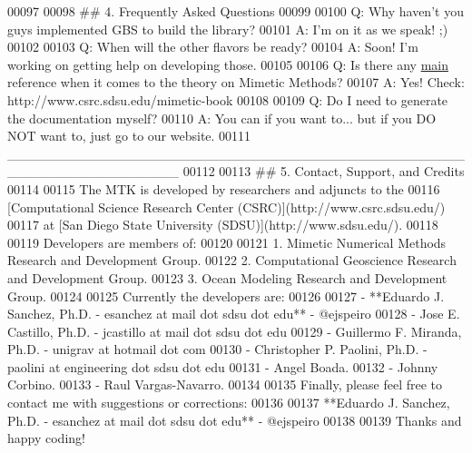 \begin{DoxyCode}
00097 \textcolor{stringliteral}{}
00098 \textcolor{stringliteral}{## 4. Frequently Asked Questions}
00099 \textcolor{stringliteral}{}
00100 \textcolor{stringliteral}{Q: Why haven'}t you guys implemented GBS to build the library?
00101 A: I\textcolor{stringliteral}{'m on it as we speak! ;)}
00102 \textcolor{stringliteral}{}
00103 \textcolor{stringliteral}{Q: When will the other flavors be ready?}
00104 \textcolor{stringliteral}{A: Soon! I'}m working on getting help on developing those.
00105 
00106 Q: Is there any \hyperlink{minimalistic__poisson__1d_8cc_ae66f6b31b5ad750f1fe042a706a4e3d4}{main} reference when it comes to the theory on Mimetic Methods?
00107 A: Yes! Check: http:\textcolor{comment}{//www.csrc.sdsu.edu/mimetic-book}
00108 
00109 Q: Do I need to generate the documentation myself?
00110 A: You can \textcolor{keywordflow}{if} you want to... but \textcolor{keywordflow}{if} you DO NOT want to, just go to our website.
00111     \_\_\_\_\_\_\_\_\_\_\_\_\_\_\_\_\_\_\_\_\_\_\_\_\_\_\_\_\_\_\_\_\_\_\_\_\_\_\_\_\_\_\_\_\_\_\_\_\_\_\_\_\_\_\_\_\_\_\_\_\_\_\_\_\_\_
00112 
00113 \textcolor{preprocessor}{## 5. Contact, Support, and Credits}
00114 \textcolor{preprocessor}{}
00115 The MTK is developed by researchers and adjuncts to the
00116 [Computational Science Research Center (CSRC)](http:\textcolor{comment}{//www.csrc.sdsu.edu/)}
00117 at [San Diego State University (SDSU)](http:\textcolor{comment}{//www.sdsu.edu/).}
00118 
00119 Developers are members of:
00120 
00121 1. Mimetic Numerical Methods Research and Development Group.
00122 2. Computational Geoscience Research and Development Group.
00123 3. Ocean Modeling Research and Development Group.
00124 
00125 Currently the developers are:
00126 
00127 - **Eduardo J. Sanchez, Ph.D. - esanchez at mail dot sdsu dot edu** - @ejspeiro
00128 - Jose E. Castillo, Ph.D. - jcastillo at mail dot sdsu dot edu
00129 - Guillermo F. Miranda, Ph.D. - unigrav at hotmail dot com
00130 - Christopher P. Paolini, Ph.D. - paolini at engineering dot sdsu dot edu
00131 - Angel Boada.
00132 - Johnny Corbino.
00133 - Raul Vargas-Navarro.
00134 
00135 Finally, please feel free to contact me with suggestions or corrections:
00136 
00137 **Eduardo J. Sanchez, Ph.D. - esanchez at mail dot sdsu dot edu** - @ejspeiro
00138 
00139 Thanks and happy coding!
\end{DoxyCode}
